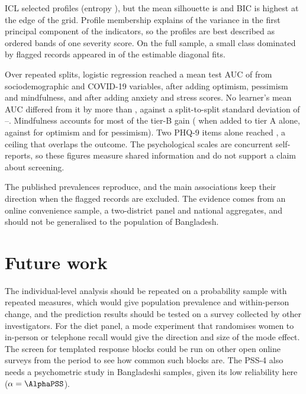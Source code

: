 \begin{description}[leftmargin=1.2cm,style=nextline]
  \item[RQ4] ICL selected \GmmK{} profiles (entropy \GmmEntropy), but the mean silhouette is \GmmSil{} and BIC is highest at the edge of the grid. Profile membership explains \ProfPcOneRsq{} of the variance in the first principal component of the indicators, so the profiles are best described as ordered bands of one severity score. On the full sample, a small class dominated by flagged records appeared in \SpikeFits{} of the \SpikeFitsTotal{} estimable diagonal fits.
  \item[RQ5] Over \RepN{} repeated splits, logistic regression reached a mean test AUC of \RepAucALogit{} from sociodemographic and COVID-19 variables, \RepAucBLogit{} after adding optimism, pessimism and mindfulness, and \RepAucCLogit{} after adding anxiety and stress scores. No learner's mean AUC differed from it by more than \RepMaxAbsDiff, against a split-to-split standard deviation of \RepSdMin--\RepSdMax. Mindfulness accounts for most of the tier-B gain (\AblAMind{} when added to tier A alone, against \AblAOpt{} for optimism and \AblAPess{} for pessimism). Two PHQ-9 items alone reached \AblPhqTwo, a ceiling that overlaps the outcome. The psychological scales are concurrent self-reports, so these figures measure shared information and do not support a claim about screening.
\end{description}

The published prevalences reproduce, and the main associations keep their direction when the flagged records are excluded. The evidence comes from an online convenience sample, a two-district panel and national aggregates, and should not be generalised to the population of Bangladesh.

\section{Future work}
The individual-level analysis should be repeated on a probability sample with repeated measures, which would give population prevalence and within-person change, and the prediction results should be tested on a survey collected by other investigators. For the diet panel, a mode experiment that randomises women to in-person or telephone recall would give the direction and size of the mode effect. The screen for templated response blocks could be run on other open online surveys from the period to see how common such blocks are. The PSS-4 also needs a psychometric study in Bangladeshi samples, given its low reliability here ($\alpha = \AlphaPSS$).
